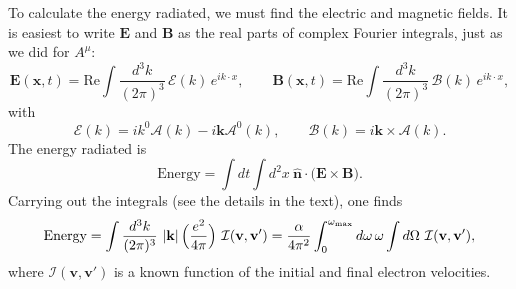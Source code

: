 To calculate the energy radiated, we must find the electric and magnetic
fields.  It is easiest to write $\mathbf{E}$ and $\mathbf{B}$ as the real parts
of complex Fourier integrals, just as we did for $A^\mu$:
\begin{equation}
  \mathbf{E}(\mathbf{x},t) = \mathrm{Re}\int \frac{d^3k}{(2\pi)^3}\,
    \bm{\mathcal{E}}(k)\,e^{ik\cdot x},\qquad
  \mathbf{B}(\mathbf{x},t) = \mathrm{Re}\int \frac{d^3k}{(2\pi)^3}\,
    \bm{\mathcal{B}}(k)\,e^{ik\cdot x},
\end{equation}
with
\begin{equation}
  \bm{\mathcal{E}}(k) = ik^0\bm{\mathcal{A}}(k)
    - i\mathbf{k}\mathcal{A}^0(k),\qquad
  \bm{\mathcal{B}}(k) = i\mathbf{k}\times\bm{\mathcal{A}}(k) .
\end{equation}
The energy radiated is
\begin{equation}
  \text{Energy} = \int dt \int d^2x\ \hat{\mathbf{n}}\cdot
    \bigl( \mathbf{E}\times\mathbf{B} \bigr) .
\end{equation}
Carrying out the integrals (see the details in the text), one finds
\begin{equation}
  \text{Energy} = \int \frac{d^3k}{(2\pi)^3}\ |\mathbf{k}|\,
    \Bigl( \frac{e^2}{4\pi} \Bigr)\ \mathcal{I}(\mathbf{v}, \mathbf{v}')
  = \frac{\alpha}{4\pi^2}\int_0^{\omega_{\mathrm{max}}} d\omega\,
    \omega \int d\Omega\ \mathcal{I}(\mathbf{v}, \mathbf{v}'),
  \label{eq:6.12}
\end{equation}
where $\mathcal{I}(\mathbf{v},\mathbf{v}')$ is a known function of the initial
and final electron velocities.


